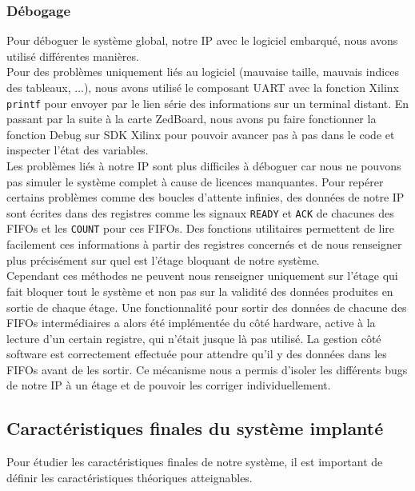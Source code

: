 \subsubsection{Débogage}
Pour déboguer le système global, notre IP avec le logiciel embarqué, nous avons
utilisé différentes manières. \\
Pour des problèmes uniquement liés au logiciel (mauvaise taille, mauvais indices
des tableaux, ...),
nous avons utilisé le composant
UART avec la fonction Xilinx \texttt{printf} pour envoyer par le lien série des
informations sur un terminal distant. En passant par la suite à la carte ZedBoard,
nous avons pu faire fonctionner la fonction Debug sur SDK Xilinx pour pouvoir
avancer pas à pas dans le code et inspecter l'état des variables. \\
Les problèmes liés à notre IP sont plus difficiles à déboguer car nous ne pouvons
pas simuler le système complet à cause de licences manquantes. Pour repérer
certains problèmes comme des boucles d'attente infinies, des données de
notre IP sont écrites dans des registres comme les signaux \texttt{READY} et
\texttt{ACK} de chacunes des FIFOs et les \texttt{COUNT} pour ces FIFOs. Des
fonctions utilitaires permettent de lire facilement ces informations à partir
des registres concernés et de nous renseigner plus précisément sur quel est
l'étage bloquant de notre système. \\
Cependant ces méthodes ne peuvent nous renseigner uniquement sur l'étage qui
fait bloquer tout le système et non pas sur la validité des données produites
en sortie de chaque étage. Une fonctionnalité pour sortir des données de chacune
des FIFOs intermédiaires a alors été implémentée du côté hardware, active à la
lecture d'un certain registre, qui n'était jusque là pas utilisé. La gestion
côté software est correctement effectuée pour attendre qu'il y des données dans
les FIFOs avant de les sortir. Ce mécanisme nous a permis d'isoler les différents
bugs de notre IP à un étage et de pouvoir les corriger individuellement.

\subsection{Caractéristiques finales du système implanté}
Pour étudier les caractéristiques finales de notre système, il est important
de définir les caractéristiques théoriques atteignables.

